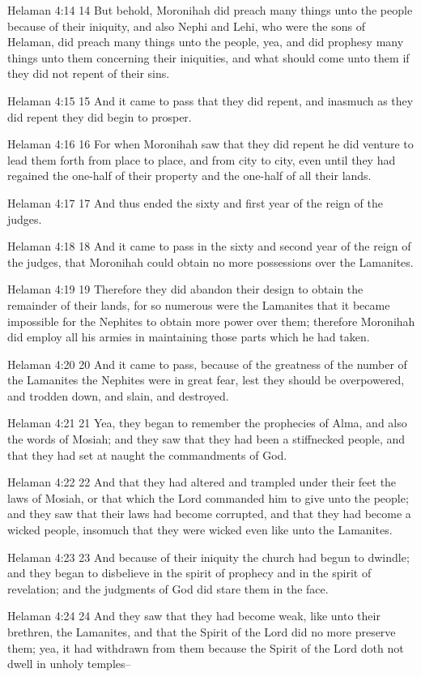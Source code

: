 Helaman 4:14
 14 But behold, Moronihah did preach many things unto the people
because of their iniquity, and also Nephi and Lehi, who were the
sons of Helaman, did preach many things unto the people, yea, and
did prophesy many things unto them concerning their iniquities,
and what should come unto them if they did not repent of their
sins.

Helaman 4:15
 15 And it came to pass that they did repent, and inasmuch as
they did repent they did begin to prosper.

Helaman 4:16
 16 For when Moronihah saw that they did repent he did venture to
lead them forth from place to place, and from city to city, even
until they had regained the one-half of their property and the
one-half of all their lands.

Helaman 4:17
 17 And thus ended the sixty and first year of the reign of the
judges.

Helaman 4:18
 18 And it came to pass in the sixty and second year of the reign
of the judges, that Moronihah could obtain no more possessions
over the Lamanites.

Helaman 4:19
 19 Therefore they did abandon their design to obtain the
remainder of their lands, for so numerous were the Lamanites that
it became impossible for the Nephites to obtain more power over
them; therefore Moronihah did employ all his armies in
maintaining those parts which he had taken.

Helaman 4:20
 20 And it came to pass, because of the greatness of the number
of the Lamanites the Nephites were in great fear, lest they
should be overpowered, and trodden down, and slain, and
destroyed.

Helaman 4:21
 21 Yea, they began to remember the prophecies of Alma, and also
the words of Mosiah; and they saw that they had been a
stiffnecked people, and that they had set at naught the
commandments of God.

Helaman 4:22
 22 And that they had altered and trampled under their feet the
laws of Mosiah, or that which the Lord commanded him to give unto
the people; and they saw that their laws had become corrupted,
and that they had become a wicked people, insomuch that they were
wicked even like unto the Lamanites.

Helaman 4:23
 23 And because of their iniquity the church had begun to
dwindle; and they began to disbelieve in the spirit of prophecy
and in the spirit of revelation; and the judgments of God did
stare them in the face.

Helaman 4:24
 24 And they saw that they had become weak, like unto their
brethren, the Lamanites, and that the Spirit of the Lord did no
more preserve them; yea, it had withdrawn from them because the
Spirit of the Lord doth not dwell in unholy temples--

